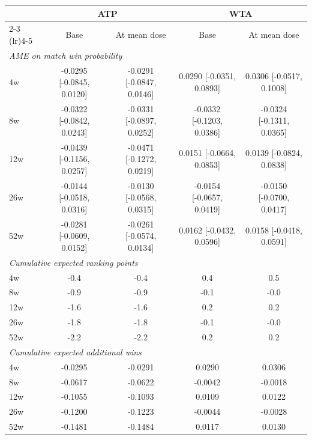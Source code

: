 \begin{tabular}{l cccc}
\toprule
 & \multicolumn{2}{c}{ATP} & \multicolumn{2}{c}{WTA} \\
\cmidrule(lr){2-3} \cmidrule(lr){4-5}
 & Base & At mean dose & Base & At mean dose \\
\midrule
\multicolumn{5}{l}{\textit{AME on match win probability}} \\
4w & -0.0295 [-0.0845, 0.0120] & -0.0291 [-0.0847, 0.0146] & 0.0290 [-0.0351, 0.0893] & 0.0306 [-0.0517, 0.1008] \\
8w & -0.0322 [-0.0842, 0.0243] & -0.0331 [-0.0897, 0.0252] & -0.0332 [-0.1203, 0.0386] & -0.0324 [-0.1311, 0.0365] \\
12w & -0.0439 [-0.1156, 0.0257] & -0.0471 [-0.1272, 0.0219] & 0.0151 [-0.0664, 0.0853] & 0.0139 [-0.0824, 0.0838] \\
26w & -0.0144 [-0.0518, 0.0316] & -0.0130 [-0.0568, 0.0315] & -0.0154 [-0.0657, 0.0419] & -0.0150 [-0.0700, 0.0417] \\
52w & -0.0281 [-0.0609, 0.0152] & -0.0261 [-0.0574, 0.0134] & 0.0162 [-0.0432, 0.0596] & 0.0158 [-0.0418, 0.0591] \\
\midrule
\multicolumn{5}{l}{\textit{Cumulative expected ranking points}} \\
4w & -0.4 & -0.4 & 0.4 & 0.5 \\
8w & -0.9 & -0.9 & -0.1 & -0.0 \\
12w & -1.6 & -1.6 & 0.2 & 0.2 \\
26w & -1.8 & -1.8 & -0.1 & -0.0 \\
52w & -2.2 & -2.2 & 0.2 & 0.2 \\
\midrule
\multicolumn{5}{l}{\textit{Cumulative expected additional wins}} \\
4w & -0.0295 & -0.0291 & 0.0290 & 0.0306 \\
8w & -0.0617 & -0.0622 & -0.0042 & -0.0018 \\
12w & -0.1055 & -0.1093 & 0.0109 & 0.0122 \\
26w & -0.1200 & -0.1223 & -0.0044 & -0.0028 \\
52w & -0.1481 & -0.1484 & 0.0117 & 0.0130 \\
\bottomrule
\end{tabular}
